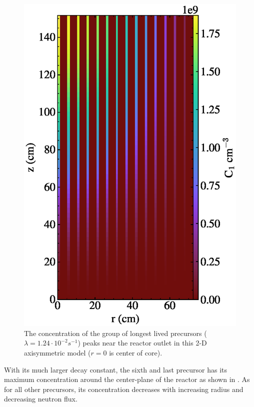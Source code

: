 \documentclass{article}
\begin{document}
\begin{figure}[htpb]
  \centering
  \includegraphics{2d_gamma_heating_pre1_scaled.eps}
        \caption{The concentration of the group of longest lived precursors
        ($\lambda = 1.24\cdot 10^{-2} s^{-1}$) peaks near the reactor outlet
        in this 2-D axisymmetric model ($r=0$ is center of core).}
  \label{fig:pre1}
\end{figure}

With its much larger decay constant, the sixth and last precursor has its
maximum concentration around the center-plane of the reactor as shown in
. As for all other precursors, its concentration decreases with
increasing radius and decreasing neutron flux.
\end{document}
